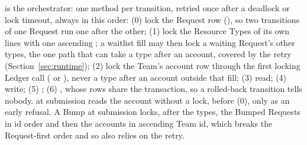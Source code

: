 \textbf{} is the orchestrator: one  method per transition, retried once after a deadlock or lock timeout, always in this order: (0) lock the Request row (), so two transitions of one Request run one after the other; (1) lock the Resource Types of its own lines with one ascending ; a waitlist fill may then lock a waiting Request's other types, the one path that can take a type after an account, covered by the retry (Section~\ref{sec:runtime}); (2) lock the Team's account row through the first locking Ledger call ( or ), never a type after an account outside that fill; (3) read; (4) write; (5) ; (6) , whose rows share the transaction, so a rolled-back transition tells nobody.  at submission reads the account without a lock, before (0), only as an early refusal. A Bump at submission locks, after the types, the Bumped Requests in id order and then the accounts in ascending Team id, which breaks the Request-first order and so also relies on the retry.

